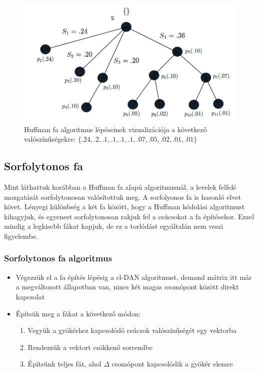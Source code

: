 \documentclass[12pt]{report}
\begin{document}
\begin{figure}[H]
\begin{center}
		\includegraphics[width=0.49\linewidth]{pictures/huffman6.png}
		\caption{Huffman fa algoritmus lépéseinek vizualizációja a következő valószínűségekre: 
			 \( \{.24, .2, .1, .1, .1, .1, .07, .05, .02, .01, .01\}\) }
		\label{huffman-algorithm}
	\end{center}
\end{figure}


\subsection{Sorfolytonos fa}

Mint láthattuk korábban a Huffman fa alapú algoritmusnál, a levelek felfelé mozgatását sorfolytonosan valósítottuk meg. A sorfolyonos fa is hasonló elvet követ.
Lényegi különbség a két fa között, hogy a Huffman kódolási algoritmust kihagyjuk, és egyenest sorfolytonosan rakjuk fel a csúcsokat a fa építésekor.
Ezzel mindig a legkisebb fákat kapjuk, de ez a torlódást egyáltalán nem veszi figyelembe.

\subsubsection{Sorfolytonos fa algoritmus}
\begin{itemize}
	\item Végezzük el a fa építés lépésig a cl-DAN algoritmust, demand mátrix itt már a megváltozott állapotban van, nincs két magas csomópont között direkt kapcsolat
	\item Építsük meg a fákat a következő módon:
	\begin{enumerate}
		\item Vegyük a gyökérhez kapcsolódó csúcsok valószínűségét egy vektorba
		\item Rendezzük a vektort csökkenő sorrendbe
		\item Építsünk teljes fát, ahol $\Delta$ csomópont kapcsolódik a gyökér elemre
	\end{enumerate}
\end{itemize}
\end{document}
